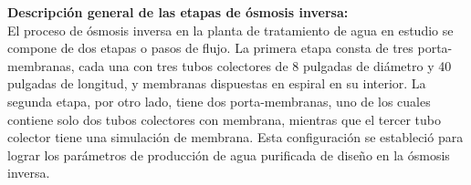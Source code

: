 \textbf{Descripción general de las etapas de ósmosis inversa:}\\
El proceso de ósmosis inversa en la planta de tratamiento de agua en estudio se compone de dos etapas o pasos de flujo. La primera etapa consta de tres porta-membranas, cada una con tres tubos colectores de 8 pulgadas de diámetro y 40 pulgadas de longitud, y membranas dispuestas en espiral en su interior. La segunda etapa, por otro lado, tiene dos porta-membranas, uno de los cuales contiene solo dos tubos colectores con membrana, mientras que el tercer tubo colector tiene una simulación de membrana. Esta configuración se estableció para lograr los parámetros de producción de agua purificada de diseño en la ósmosis inversa.

